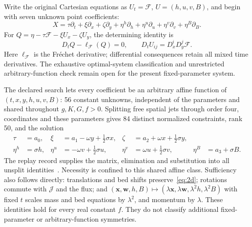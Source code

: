 \documentclass[12pt,a4paper,oneside]{report}
\numberwithin{equation}{chapter}
\theoremstyle{remark}\newtheorem{remark}[theorem]{Remark}
\begin{document}
Write the original Cartesian equations as $U_t=\mathcal F$, $U=(h,u,v,B)$,
and begin with seven unknown point coefficients:
\begin{equation}
 X=\tau\partial_t+\xi\partial_x+\zeta\partial_y+
       \eta^h\partial_h+\eta^u\partial_u+\eta^v\partial_v+\eta^B\partial_B.
\end{equation}
For $Q=\eta-\tau\mathcal F-\xi U_x-\zeta U_y$, the determining identity is
\begin{equation}\label{eq:2d-determining}
 D_tQ-\ell_{\mathcal F}(Q)=0,
 \qquad D_tU_{ij}=D_x^iD_y^j\mathcal F.
\end{equation}
Here $\ell_{\mathcal F}$ is the Fr\'echet derivative; differential consequences
retain all mixed time derivatives. The exhaustive optimal-system classification and unrestricted arbitrary-function
check remain open for the present fixed-parameter system.\par
The declared search lets every coefficient be an arbitrary affine function of $(t,x,y,h,u,v,B)$: 56 constant unknowns,
independent of the parameters and shared throughout $g,K,G,f>0$. Splitting
free spatial jets through order four, coordinates and these parameters gives
84 distinct normalized constraints, rank 50, and the solution
\begin{equation}\label{eq:returned}
\begin{aligned}
 \tau&=a_0,&\xi&=a_1-\omega y+\tfrac12\sigma x,&
 \zeta&=a_2+\omega x+\tfrac12\sigma y,\\
 \eta^h&=\sigma h,&\eta^u&=-\omega v+\tfrac12\sigma u,&
 \eta^v&=\omega u+\tfrac12\sigma v,&\eta^B&=a_3+\sigma B.
\end{aligned}
\end{equation}
The replay record supplies the matrix, elimination and substitution into all
unsplit identities~\cite{theoremartifact}. Necessity is confined to this
shared affine class. Sufficiency also follows directly: translations and bed
shifts preserve~\eqref{eq:2d}; rotations commute with $\mathcal J$ and the
flux; and $(\mathbf x,\mathbf w,h,B)\mapsto
(\lambda\mathbf x,\lambda\mathbf w,\lambda^2h,\lambda^2B)$ with fixed $t$
scales mass and bed equations by $\lambda^2$, and momentum by $\lambda$.
These identities hold for every real constant $f$. They do not classify
additional fixed-parameter or arbitrary-function symmetries.
\end{document}
